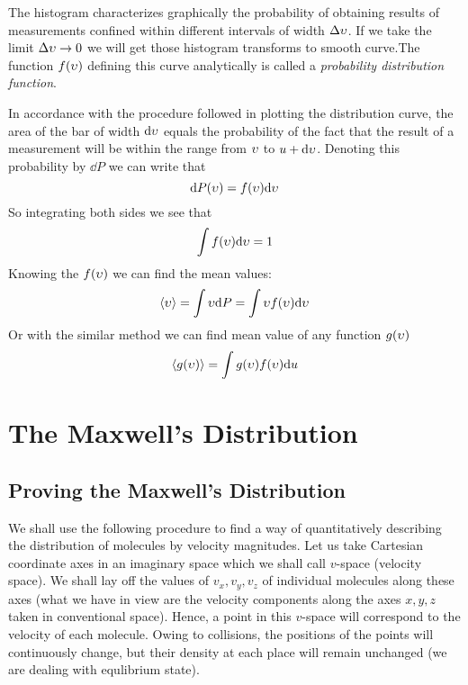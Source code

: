 \documentclass[a4paper, 12pt]{article}
\begin{document}
The histogram characterizes graphically the probability of obtaining
results of measurements confined within different intervals of width $\Delta \upsilon$. If we take the limit $\Delta \upsilon \to 0$ we will
get those histogram transforms to smooth curve.The function $f(\upsilon)$ defining this curve 
analytically is called a \emph{probability distribution function}.

In accordance with the procedure followed in plotting the distribution
curve, the area of the bar of width $\dd \upsilon$ equals the probability of the fact that the result of a
measurement will be within the range from $\upsilon$ to $u + \dd\upsilon$. Denoting this probability by $\dd P$ 
we can write that $$\dd P(\upsilon) = f(\upsilon)\dd\upsilon$$
So integrating both sides we see that $$\int f(\upsilon)\dd\upsilon=1$$ Knowing the $f(\upsilon)$ we can find the mean values:
$$\langle \upsilon \rangle=\int \upsilon \dd P=\int \upsilon f(\upsilon)\dd\upsilon$$ Or with the similar method we can find mean value of any function $g(\upsilon)$
$$\langle g(\upsilon)\rangle =\int g(\upsilon)f(\upsilon)\dd u$$
\section{The Maxwell's Distribution}\label{sec:maxwell}
\subsection{Proving the Maxwell's Distribution}
We shall use the following procedure to find a way of quantitatively describing the distribution of 
molecules by velocity magnitudes. Let us take Cartesian coordinate axes in an imaginary space which
we shall call $v$-space (velocity space). We shall lay off the values of $v_x, v_y, v_z$ of individual 
molecules along these axes (what we have in view are the velocity components along the axes $x, y, z$ taken
in conventional space). Hence, a point in this $v$-space will correspond to the velocity of each molecule.
Owing to collisions, the positions of the points will continuously change, but their density at each 
place will remain unchanged (we are dealing with equlibrium state).
\end{document}
